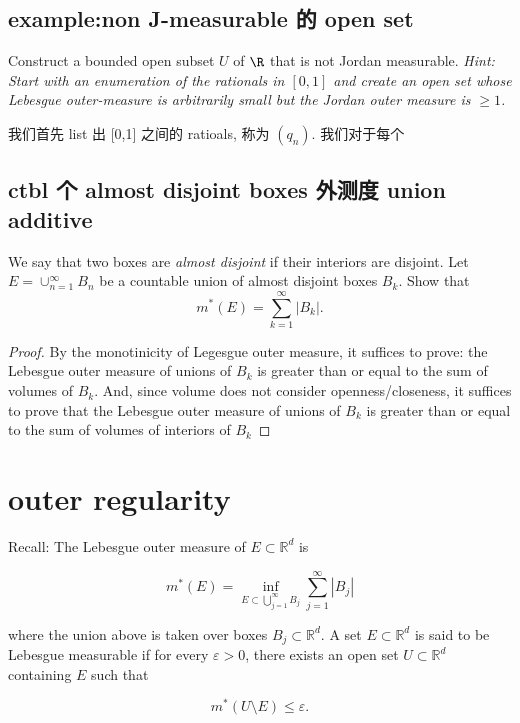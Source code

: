 \documentclass[lang=cn,11pt]{template}
\begin{document}
\section{example:non J-measurable 的 open set}
Construct a bounded open subset $U$ of $\R$ that is not Jordan measurable. \emph{Hint: Start with an enumeration of the rationals in $[0,1]$ and create an open set whose Lebesgue outer-measure is arbitrarily small but the Jordan outer measure is $\geq 1$.}

\begin{solution}
    我们首先 list 出 [0,1] 之间的 ratioals, 称为 $(q_n)$. 我们对于每个 
\end{solution}


\section{ctbl 个 almost disjoint boxes 外测度 union additive}
 We say that two boxes are \emph{almost disjoint} if their interiors are disjoint. Let $E=\cup_{n=1}^\infty B_n$ be a countable union of almost disjoint boxes $B_k$. Show that 
$$
m^*(E)=\sum_{k=1}^\infty |B_k|.
$$
\begin{proof}
By the monotinicity of Legesgue outer measure, it suffices to prove: the Lebesgue outer measure of unions of $B_k$ is greater than or equal to the sum of volumes of $B_k$. And, since volume does not consider openness/closeness, it suffices to prove that the Lebesgue outer measure of unions of $B_k$ is greater than or equal to the sum of volumes of interiors of $B_k$
\end{proof}



\newpage
\chapter{outer regularity}
Recall:
The Lebesgue outer measure of $E \subset \mathbb{R}^d$ is

\[
m^*(E) = \inf_{E \subset \bigcup_{j=1}^{\infty} B_j} \sum_{j=1}^{\infty} |B_j|
\]

where the union above is taken over boxes $B_j \subset \mathbb{R}^d$. A set $E \subset \mathbb{R}^d$ is said to be Lebesgue measurable if for every $\varepsilon > 0$, there exists an open set $U \subset \mathbb{R}^d$ containing $E$ such that 

\[
m^*(U \setminus E) \leq \varepsilon.
\]
\end{document}
